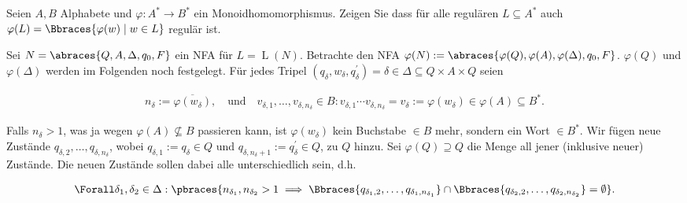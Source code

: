 
\begin{exercise}

Seien $A, B$ Alphabete und $\varphi: A^\ast \to B^\ast$ ein Monoidhomomorphismus.
Zeigen Sie dass für alle regulären $L \subseteq A^\ast$ auch $\varphi(L) = \Bbraces{\varphi(w) \mid w \in L}$ regulär ist.

\end{exercise}


\begin{solution}

Sei $N = \abraces{Q, A, \Delta, q_0, F}$ ein NFA für $L = \operatorname L(N)$.
Betrachte den NFA $\varphi(N) := \abraces{\varphi(Q), \varphi(A), \varphi(\Delta), q_0, F}$.
$\varphi(Q)$ und $\varphi(\Delta)$ werden im Folgenden noch festgelegt.
Für jedes Tripel $(q_\delta, w_\delta, q_\delta^\prime) = \delta \in \Delta \subseteq Q \times A \times Q$ seien

\begin{align*}
    n_\delta := \overline{\varphi(w_\delta)},
    \quad
    \text{und}
    \quad
    v_{\delta, 1}, \dots, v_{\delta, n_\delta} \in B:
        v_{\delta, 1} \cdots v_{\delta, n_\delta}
        =
        v_\delta
        :=
        \varphi(w_\delta)
        \in
        \varphi(A) \subseteq B^\ast.
\end{align*}

Falls $n_\delta > 1$, was ja wegen $\varphi(A) \not \subseteq B$ passieren kann, ist $\varphi(w_\delta)$ kein Buchstabe $\in B$ mehr, sondern ein  Wort $\in B^\ast$.
Wir fügen neue Zustände $q_{\delta, 2}, \dots, q_{\delta, n_{\delta}}$, wobei $q_{\delta, 1} := q_\delta \in Q$ und $q_{\delta, n_\delta + 1} := q_\delta^\prime \in Q$, zu $Q$ hinzu.
Sei $\varphi(Q) \supseteq Q$ die Menge all jener (inklusive neuer) Zustände.
Die neuen Zustände sollen dabei alle unterschiedlich sein, d.h.

\begin{align*}
    \Forall \delta_1, \delta_2 \in \Delta:
        \pbraces
        {
            n_{\delta_1}, n_{\delta_2} > 1
            \implies
            \Bbraces{q_{\delta_1, 2}, \dots, q_{\delta_1, n_{\delta_1}}}
            \cap
            \Bbraces{q_{\delta_2, 2}, \dots, q_{\delta_2, n_{\delta_2}}}
            =
            \emptyset
        }.
\end{align*}


\end{solution}
